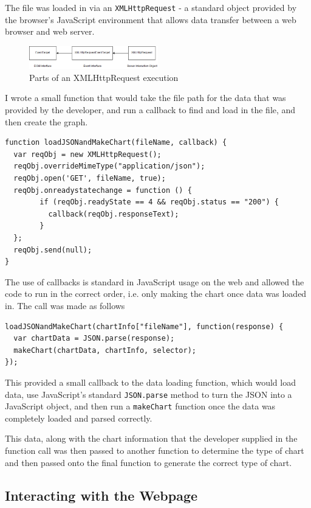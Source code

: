 \documentclass[ %
                    author={Aleena Baig},
                supervisor={Dr Simon Lock},
                    degree={BSc},
                     title={On Making Web Accessible Graphs},
                  subtitle={},
                      year={2019} ]{dissertation}
\begin{document}
The file was loaded in via an \texttt{XMLHttpRequest} - a standard object provided by the browser's JavaScript environment that allows data transfer between a web browser and web server.

\begin{figure}[h]
\caption{Parts of an XMLHttpRequest execution}
\centering
\includegraphics[width=0.5\textwidth]{images/XMLHttpRequest.png}
\end{figure}

I wrote a small function that would take the file path for the data that was provided by the developer, and run a callback to find and load in the file, and then create the graph.

\begin{lstlisting}
function loadJSONandMakeChart(fileName, callback) {
  var reqObj = new XMLHttpRequest();
  reqObj.overrideMimeType("application/json");
  reqObj.open('GET', fileName, true);
  reqObj.onreadystatechange = function () {
        if (reqObj.readyState == 4 && reqObj.status == "200") {
          callback(reqObj.responseText);
        }
  };
  reqObj.send(null);
}
\end{lstlisting}

The use of callbacks is standard in JavaScript usage on the web and allowed the code to run in the correct order, i.e. only making the chart once data was loaded in. The call was made as follows

\begin{lstlisting}
loadJSONandMakeChart(chartInfo["fileName"], function(response) {
  var chartData = JSON.parse(response);
  makeChart(chartData, chartInfo, selector);
});
\end{lstlisting}

This provided a small callback to the data loading function, which would load data, use JavaScript's standard \texttt{JSON.parse} method to turn the JSON into a JavaScript object, and then run a \texttt{makeChart} function once the data was completely loaded and parsed correctly.

This data, along with the chart information that the developer supplied in the function call was then passed to another function to determine the type of chart and then passed onto the final function to generate the correct type of chart.

\subsection{Interacting with the Webpage}
\end{document}
